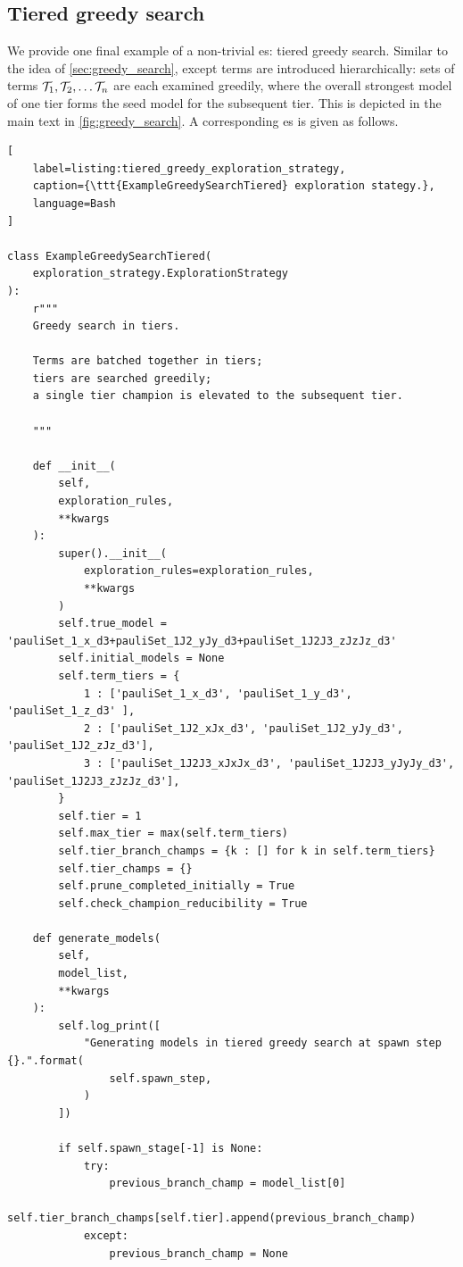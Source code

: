 \subsection{Tiered greedy search}
We provide one final example of a non-trivial \gls{es}: 
    tiered greedy search. 
Similar to the idea of \cref{sec:greedy_search}, 
    except terms are introduced hierarchically:
    sets of terms $\mathcal{T}_1, \mathcal{T}_2, \dots \mathcal{T}_n$ 
    are each examined greedily, where the overall strongest model of one tier 
    forms the seed model for the subsequent tier. 
This is depicted in the main text in \cref{fig:greedy_search}. 
A corresponding \gls{es} is given as follows. 

\begin{lstlisting}[
    label=listing:tiered_greedy_exploration_strategy,
    caption={\ttt{ExampleGreedySearchTiered} exploration stategy.},
    language=Bash
]

class ExampleGreedySearchTiered(
    exploration_strategy.ExplorationStrategy
):
    r"""
    Greedy search in tiers.

    Terms are batched together in tiers; 
    tiers are searched greedily; 
    a single tier champion is elevated to the subsequent tier. 

    """

    def __init__(
        self,
        exploration_rules,
        **kwargs
    ):
        super().__init__(
            exploration_rules=exploration_rules,
            **kwargs
        )
        self.true_model = 'pauliSet_1_x_d3+pauliSet_1J2_yJy_d3+pauliSet_1J2J3_zJzJz_d3'
        self.initial_models = None
        self.term_tiers = {
            1 : ['pauliSet_1_x_d3', 'pauliSet_1_y_d3', 'pauliSet_1_z_d3' ],
            2 : ['pauliSet_1J2_xJx_d3', 'pauliSet_1J2_yJy_d3', 'pauliSet_1J2_zJz_d3'],
            3 : ['pauliSet_1J2J3_xJxJx_d3', 'pauliSet_1J2J3_yJyJy_d3', 'pauliSet_1J2J3_zJzJz_d3'],
        }
        self.tier = 1
        self.max_tier = max(self.term_tiers)
        self.tier_branch_champs = {k : [] for k in self.term_tiers} 
        self.tier_champs = {}
        self.prune_completed_initially = True
        self.check_champion_reducibility = True

    def generate_models(
        self,
        model_list,
        **kwargs
    ):
        self.log_print([
            "Generating models in tiered greedy search at spawn step {}.".format(
                self.spawn_step, 
            )
        ])

        if self.spawn_stage[-1] is None:
            try:
                previous_branch_champ = model_list[0]
                self.tier_branch_champs[self.tier].append(previous_branch_champ)
            except:
                previous_branch_champ = None


\end{lstlisting}
